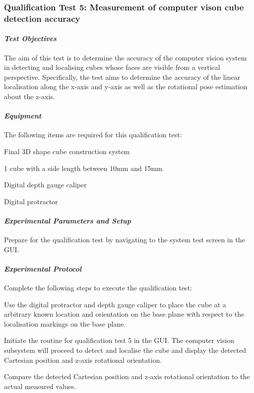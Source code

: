 \subsubsection*{Qualification Test 5: Measurement of computer vison cube detection accuracy}

\paragraph{\textit{Test Objectives}}

The aim of this test is to determine the accuracy of the computer vision system in detecting and localising cubes whose faces are visible from a vertical perspective. Specifically, the test aims to determine the accuracy of the linear localisation along the x-axis and y-axis as well as the rotational pose estimation about the z-axis.

\paragraph{\textit{Equipment}}

The following items are required for this qualification test:

\begin{compactitem}
    \item Final 3D shape cube construction system
    \item 1 cube with a side length between 10mm and 15mm
    \item Digital depth gauge caliper
    \item Digital protractor
\end{compactitem}

\paragraph{\textit{Experimental Parameters and Setup}}

Prepare for the qualification test by navigating to the system test screen in the GUI.

\paragraph{\textit{Experimental Protocol}}

Complete the following steps to execute the qualification test:

\begin{compactenum}
    \item Use the digital protractor and depth gauge caliper to place the cube at a arbitrary known location and orientation on the base plane with respect to the localisation markings on the base plane.
    \item Initiate the routine for qualification test 5 in the GUI. The computer vision subsystem will proceed to detect and localise the cube and display the detected Cartesian position and z-axis rotational orientation.
    \item Compare the detected Cartesian position and z-axis rotational orientation to the actual measured values.
\end{compactenum}

